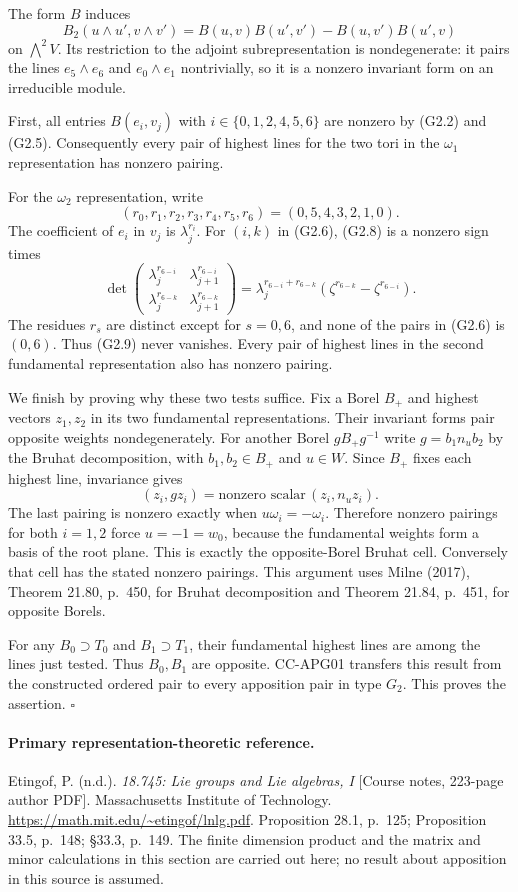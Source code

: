 The form $B$ induces
\[
 B_2(u\wedge u',v\wedge v')
        =B(u,v)B(u',v')-B(u,v')B(u',v)
 \tag{G2.8}
\]
on $\bigwedge^2V$.  Its restriction to the adjoint
subrepresentation is nondegenerate: it pairs the lines
$e_5\wedge e_6$ and $e_0\wedge e_1$ nontrivially,
so it is a nonzero invariant form on an irreducible module.

First, all entries $B(e_i,v_j)$ with
$i\in\{0,1,2,4,5,6\}$ are nonzero by (G2.2) and (G2.5).
Consequently every pair of highest lines for the two tori in
the $\omega_1$ representation has nonzero pairing.

For the $\omega_2$ representation, write
\[
 (r_0,r_1,r_2,r_3,r_4,r_5,r_6)=(0,5,4,3,2,1,0).
\]
The coefficient of $e_i$ in $v_j$ is $\lambda_j^{r_i}$.
For $(i,k)$ in (G2.6), (G2.8) is a nonzero sign times
\[
 \det\begin{pmatrix}
  \lambda_j^{r_{6-i}}&\lambda_{j+1}^{r_{6-i}}\\
  \lambda_j^{r_{6-k}}&\lambda_{j+1}^{r_{6-k}}
 \end{pmatrix}
  =\lambda_j^{r_{6-i}+r_{6-k}}
        (\zeta^{r_{6-k}}-\zeta^{r_{6-i}}).
 \tag{G2.9}
\]
The residues $r_s$ are distinct except for $s=0,6$,
and none of the pairs in (G2.6) is $(0,6)$.
Thus (G2.9) never vanishes.  Every pair of highest lines
in the second fundamental representation also has nonzero
pairing.

We finish by proving why these two tests suffice.  Fix a
Borel $B_+$ and highest vectors $z_1,z_2$ in its two
fundamental representations.  Their invariant forms pair
opposite weights nondegenerately.  For another Borel
$gB_+g^{-1}$ write $g=b_1n_ub_2$ by the Bruhat
decomposition, with $b_1,b_2\in B_+$ and $u\in W$.
Since $B_+$ fixes each highest line, invariance gives
\[
             (z_i,gz_i)=\text{nonzero scalar}\,(z_i,n_uz_i).
\]
The last pairing is nonzero exactly when
$u\omega_i=-\omega_i$.  Therefore nonzero pairings for
both $i=1,2$ force $u=-1=w_0$, because the fundamental
weights form a basis of the root plane.  This is exactly
the opposite-Borel Bruhat cell.  Conversely that cell
has the stated nonzero pairings.  This argument uses
Milne (2017), Theorem 21.80, p.~450, for Bruhat
decomposition and Theorem 21.84, p.~451, for opposite Borels.

For any $B_0\supset T_0$ and $B_1\supset T_1$, their
fundamental highest lines are among the lines just tested.
Thus $B_0,B_1$ are opposite.  CC-APG01 transfers this result
from the constructed ordered pair to every apposition pair
in type $G_2$.  This proves the assertion. $\square$

\paragraph{Primary representation-theoretic reference.}
Etingof, P. (n.d.). \emph{18.745: Lie groups and Lie algebras, I}
[Course notes, 223-page author PDF]. Massachusetts Institute
of Technology. \url{https://math.mit.edu/~etingof/lnlg.pdf}.
Proposition 28.1, p.~125; Proposition 33.5, p.~148;
\S33.3, p.~149.  The finite dimension product and the
matrix and minor calculations in this section are carried
out here; no result about apposition in this source is assumed.
